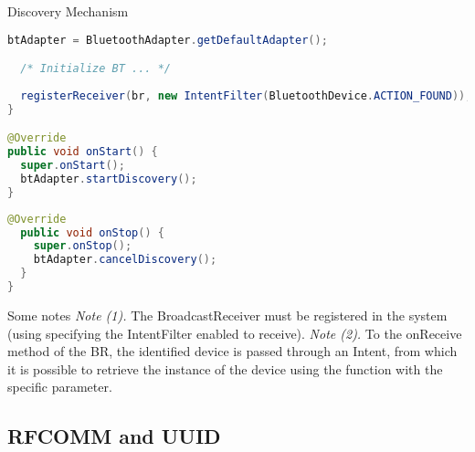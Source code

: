 \documentclass{beamer}
\begin{document}
\begin{frame}{Discovery Mechanism}
\begin{exampleblock}{\vspace{-10pt}}
\begin{lstlisting}[language=Java]
  btAdapter = BluetoothAdapter.getDefaultAdapter();

  /* Initialize BT ... */
  
  registerReceiver(br, new IntentFilter(BluetoothDevice.ACTION_FOUND));
}

@Override
public void onStart() {
  super.onStart();
  btAdapter.startDiscovery();
}
      \end{lstlisting}
    \end{exampleblock}		
    \begin{exampleblock}{\vspace{-10pt}}
      \begin{lstlisting}[language=Java]
  @Override
  public void onStop() {
    super.onStop();
    btAdapter.cancelDiscovery();
  }
}
      \end{lstlisting}
    \end{exampleblock}
    \begin{small}
      \begin{block}{Some notes}
        \textit{Note (1).} The BroadcastReceiver must be registered in the system
        (using  specifying the IntentFilter enabled to receive).
        \newline\newline
        \textit{Note (2).} To the onReceive method of the BR, the identified device
        is passed through an Intent, from which it is possible to retrieve the
        instance of the device using the  function with the
        specific parameter.
      \end{block}
    \end{small}
  \end{frame}
  
\subsection{RFCOMM and UUID}
\end{document}
